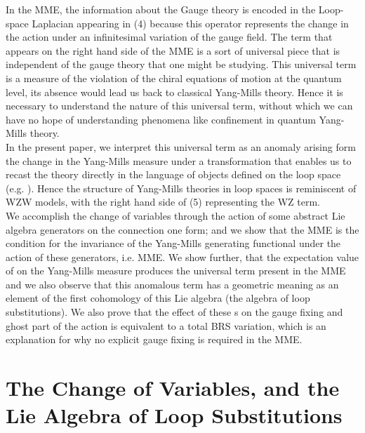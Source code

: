 \documentclass[a4paper,12]{article}
\begin{document}
In the MME, the information about the Gauge theory is encoded in the
Loop-space Laplacian appearing in (4) because this  
operator
represents the change in the action under an infinitesimal variation of 
the
gauge field. The term that appears on the right hand side of the MME is a
sort of universal piece that is independent of the gauge theory that one  
might be studying. This universal term is a measure of the violation of 
the chiral equations of motion at the quantum level, its absence would 
lead us back to classical Yang-Mills theory. Hence it is  
necessary to understand the nature of this universal term, without which 
we can have no hope of understanding phenomena like confinement in 
quantum Yang-Mills theory.\\

In the present paper, we interpret this universal term as an anomaly 
\cite{Fujikawa} 
arising form the change in the Yang-Mills measure under a transformation 
that enables us to recast the theory directly in the language of objects 
defined on the loop space (e.g. \coordHE{}). Hence the structure of 
Yang-Mills theories in 
loop spaces is reminiscent of WZW models, with the right hand side of (5) 
representing the WZ term.\\

We accomplish the change of variables \coordHE{} through 
the action of some abstract Lie algebra generators \coordHE{} on the 
connection one form; and we 
show that the MME is the condition for the invariance of the Yang-Mills 
generating functional \coordHE{} under the action of these generators, i.e. 
\coordHE{} MME. We show further, that the expectation 
value of \coordHE{} on the Yang-Mills measure produces the universal 
term present in the MME and we also observe that this anomalous term has a 
geometric meaning as an element of the first cohomology of this Lie 
algebra (the algebra of loop substitutions). We also prove that the effect 
of these \coordHE{}s on the gauge 
fixing and ghost part of the action is equivalent to a total BRS 
variation, which is an explanation for why no explicit gauge fixing is 
required in the MME.

\section{The Change of Variables, and the Lie Algebra of Loop 
Substitutions} 
\end{document}
